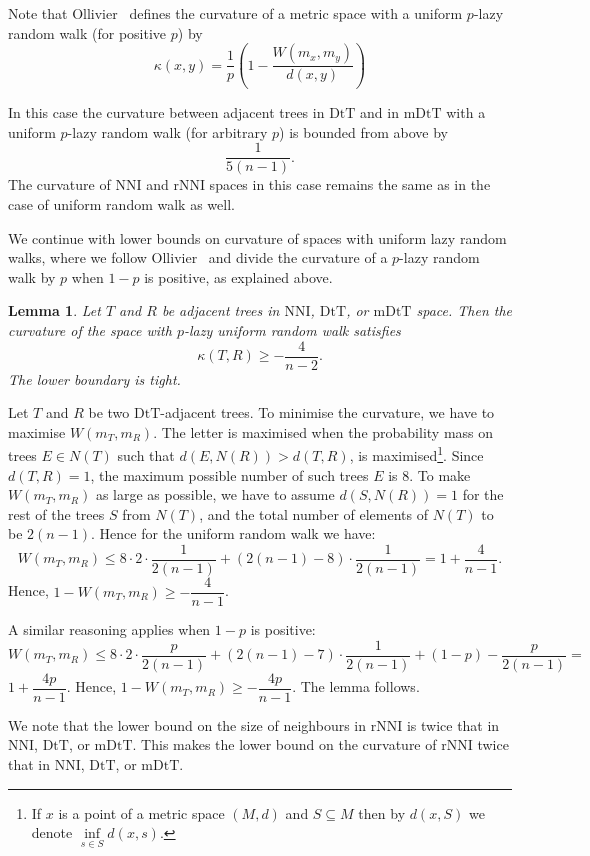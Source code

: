 \documentclass{amsart}
\newtheorem{lemma}{Lemma}
\newcommand{\dts}{\mathrm{DtT}}
\newcommand{\nni}{\mathrm{NNI}}
\newcommand{\rnni}{\mathrm{rNNI}}
\newcommand{\mdts}{\mathrm{mDtT}}
\begin{document}
Note that Ollivier~\cite{Ollivier2009-cj} defines the curvature of a metric 
space with a uniform $p$-lazy random walk (for positive $p$) by 
\[
\kappa(x,y) = \frac1p (1 - \frac{W(m_x, m_y)}{d(x, y)})
\]

In this case the curvature between adjacent trees in $\dts$ and in $\mdts$ with a uniform $p$-lazy random walk (for arbitrary $p$) is bounded from above by
\[
\frac{1}{5(n-1)}.
\]
The curvature of $\nni$ and $\rnni$ spaces in this case remains the same as in the case of uniform random walk as well. 

We continue with lower bounds on curvature of spaces with uniform lazy random walks, where we follow Ollivier~\cite{Ollivier2009-cj} and divide the curvature of a $p$-lazy random walk by $p$ when $1-p$ is positive, as explained above. 

\begin{lemma}\label{uniformLower}
Let $T$ and $R$ be adjacent trees in $\nni$, $\dts$, or $\mdts$ space. 
Then the curvature of the space with $p$-lazy uniform random walk satisfies
\[
\kappa(T,R) \geq -\frac{4}{n-2}.
\]
The lower boundary is tight. 
\end{lemma}

\proof
Let $T$ and $R$ be two $\dts$-adjacent trees. To minimise the curvature, we have
to maximise $W(m_T, m_R)$. The letter is maximised when the probability mass
on trees $E\in N(T)$ such that $d(E, N(R)) > d(T, R)$, is 
maximised\footnote{If $x$ is a point of a metric space $(M,d)$ and 
$S \subseteq M$ then by $d(x,S)$ we denote $\inf\limits_{s \in S} d(x,s)$.}. 
Since $d(T, R) = 1$, the maximum possible number of such trees $E$ is 
$8$. To make $W(m_T,m_R)$ as large as possible, we have to assume 
$d(S, N(R)) = 1$ for the rest of the trees $S$ from $N(T)$, and the
total number of elements of $N(T)$ to be $2(n-1)$.
Hence for the uniform random walk we have: 
\[
W(m_T,m_R)\leq 8 \cdot 2 \cdot \frac{1}{2(n - 1)} +
(2(n - 1) - 8) \cdot \frac{1}{2(n-1)} = 1 + \dfrac{4}{n-1}.
\]
Hence, $1 - W(m_T,m_R) \geq - \dfrac{4}{n-1}$. 

A similar reasoning applies when $1-p$ is positive:
\[
W(m_T,m_R)\leq 8 \cdot 2 \cdot \frac{p}{2(n - 1)} + 
(2(n - 1) - 7) \cdot \frac{1}{2(n-1)} + (1-p) - \frac{p}{2(n-1)} =
\]
$1 + \dfrac{4p}{n-1}$. Hence, 
$1 - W(m_T,m_R) \geq - \dfrac{4p}{n-1}$. The lemma follows. 
\endproof

We note that the lower bound on the size of neighbours in $\rnni$ is twice that in $\nni$, $\dts$, or $\mdts$. 
This makes the lower bound on the curvature of $\rnni$ twice that in $\nni$, $\dts$, or $\mdts$. 
\end{document}
